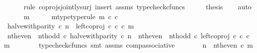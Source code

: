 \begin{isabellebody}
\ \ \ \ \isamarkupfalse%
\ {\isacharparenleft}{\kern0pt}rule\ coprojs{\isacharunderscore}{\kern0pt}jointly{\isacharunderscore}{\kern0pt}surj{\isacharcomma}{\kern0pt}\ insert\ assms{\isacharcomma}{\kern0pt}\ typecheck{\isacharunderscore}{\kern0pt}cfuncs{\isacharparenright}{\kern0pt}\isanewline
\ \ \isamarkupfalse%
\ \isamarkupfalse%
\ {\isacharquery}{\kern0pt}thesis\isanewline
\ \ \isamarkupfalse%
\ auto\isanewline
\ \ \ \ \isamarkupfalse%
\ m\isanewline
\ \ \ \ \isamarkupfalse%
\ m{\isacharunderscore}{\kern0pt}type{\isacharbrackleft}{\kern0pt}type{\isacharunderscore}{\kern0pt}rule{\isacharbrackright}{\kern0pt}{\isacharcolon}{\kern0pt}\ {\isachardoublequoteopen}m\ {\isasymin}\isactrlsub c\ {\isasymnat}\isactrlsub c{\isachardoublequoteclose}\isanewline
\ \ \ \ \isamarkupfalse%
\ {\isachardoublequoteopen}halve{\isacharunderscore}{\kern0pt}with{\isacharunderscore}{\kern0pt}parity\ {\isasymcirc}\isactrlsub c\ n\ {\isacharequal}{\kern0pt}\ left{\isacharunderscore}{\kern0pt}coproj\ {\isasymnat}\isactrlsub c\ {\isasymnat}\isactrlsub c\ {\isasymcirc}\isactrlsub c\ m{\isachardoublequoteclose}\isanewline
\ \ \ \ \isamarkupfalse%
\ \isamarkupfalse%
\ {\isachardoublequoteopen}{\isacharparenleft}{\kern0pt}{\isacharparenleft}{\kern0pt}nth{\isacharunderscore}{\kern0pt}even\ {\isasymamalg}\ nth{\isacharunderscore}{\kern0pt}odd{\isacharparenright}{\kern0pt}\ {\isasymcirc}\isactrlsub c\ halve{\isacharunderscore}{\kern0pt}with{\isacharunderscore}{\kern0pt}parity{\isacharparenright}{\kern0pt}\ {\isasymcirc}\isactrlsub c\ n\ {\isacharequal}{\kern0pt}\ {\isacharparenleft}{\kern0pt}{\isacharparenleft}{\kern0pt}nth{\isacharunderscore}{\kern0pt}even\ {\isasymamalg}\ nth{\isacharunderscore}{\kern0pt}odd{\isacharparenright}{\kern0pt}\ {\isasymcirc}\isactrlsub c\ left{\isacharunderscore}{\kern0pt}coproj\ {\isasymnat}\isactrlsub c\ {\isasymnat}\isactrlsub c{\isacharparenright}{\kern0pt}\ {\isasymcirc}\isactrlsub c\ m{\isachardoublequoteclose}\isanewline
\ \ \ \ \ \ \isamarkupfalse%
\ {\isacharparenleft}{\kern0pt}typecheck{\isacharunderscore}{\kern0pt}cfuncs{\isacharcomma}{\kern0pt}\ smt\ assms\ comp{\isacharunderscore}{\kern0pt}associative{}{\isacharparenright}{\kern0pt}\isanewline
\ \ \ \ \isamarkupfalse%
\ \isamarkupfalse%
\ {\isachardoublequoteopen}n\ {\isacharequal}{\kern0pt}\ nth{\isacharunderscore}{\kern0pt}even\ {\isasymcirc}\isactrlsub c\ m{\isachardoublequoteclose}\isanewline

\end{isabellebody}
